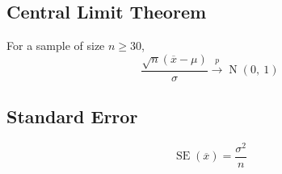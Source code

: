 \documentclass{article}
\begin{document}
\begin{multicols}{3}
    \subsection{Central Limit Theorem}
    For a sample of size \(n \ge 30\),
    \begin{equation*}
        \frac{\sqrt{n}\left( \overline{x} - \mu \right)}{\sigma} \overset{p}{\rightarrow} \operatorname{N}{\left( 0,\: 1 \right)}
    \end{equation*}
    \subsection{Standard Error}
    \begin{equation*}
        \operatorname{SE}{\left( \overline{x} \right)} = \frac{\sigma^2}{n}
    \end{equation*}

\end{multicols}
\end{document}
